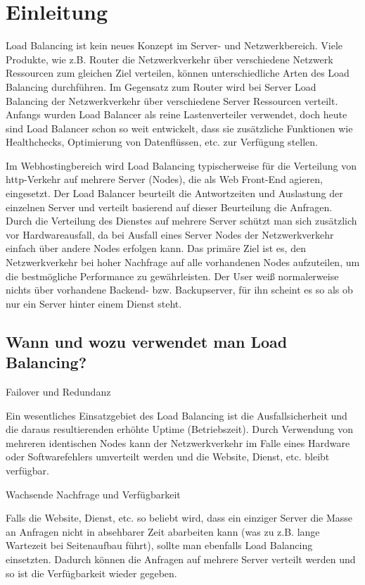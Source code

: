 
\section{Einleitung}
\label{sec:Einleitung}
Load Balancing ist kein neues Konzept im Server- und Netzwerkbereich. Viele Produkte, wie z.B. Router die Netzwerkverkehr über verschiedene Netzwerk Ressourcen zum gleichen Ziel verteilen, können unterschiedliche Arten des Load Balancing durchführen. Im Gegensatz zum Router wird bei Server Load Balancing der Netzwerkverkehr über verschiedene Server Ressourcen verteilt. Anfangs wurden Load Balancer als reine Lastenverteiler verwendet, doch heute sind Load Balancer schon so weit entwickelt, dass sie zusätzliche Funktionen wie Healthchecks, Optimierung von Datenflüssen, etc. zur Verfügung stellen.

Im Webhostingbereich wird Load Balancing typischerweise für die Verteilung von http-Verkehr auf mehrere Server (Nodes), die als Web Front-End agieren, eingesetzt. Der Load Balancer beurteilt die Antwortzeiten und Auslastung der einzelnen Server und verteilt basierend auf dieser Beurteilung die Anfragen. Durch die Verteilung des Dienstes auf mehrere Server schützt man sich zusätzlich vor Hardwareausfall, da bei Ausfall eines Server Nodes der Netzwerkverkehr einfach über andere Nodes erfolgen kann. Das primäre Ziel ist es, den Netzwerkverkehr bei hoher Nachfrage auf alle vorhandenen Nodes aufzuteilen, um die bestmögliche Performance zu gewährleisten. Der User weiß normalerweise nichts über vorhandene Backend- bzw. Backupserver, für ihn scheint es so als ob nur ein Server hinter einem Dienst steht. \cite{LoadBalancing1}

\subsection{Wann und wozu verwendet man Load Balancing?}
\label{sec:Wann und wozu verwendet man Load Balancing?}

\begin{list}{•}{}
\item Failover und Redundanz

	  Ein wesentliches Einsatzgebiet des Load Balancing ist die Ausfallsicherheit und die daraus resultierenden 		  erhöhte Uptime (Betriebszeit). Durch Verwendung von mehreren identischen Nodes kann der Netzwerkverkehr im 	  Falle eines Hardware oder Softwarefehlers umverteilt werden und die Website, Dienst, etc. bleibt 			 	  verfügbar. 
\item Wachsende Nachfrage und Verfügbarkeit
	  
	  Falls die Website, Dienst, etc. so beliebt wird, dass ein einziger Server die Masse an Anfragen nicht in 			  absehbarer Zeit abarbeiten kann (was zu z.B. lange Wartezeit bei Seitenaufbau führt), sollte man ebenfalls 	  Load Balancing einsetzten. Dadurch können die Anfragen auf mehrere Server verteilt werden und so ist die 			  Verfügbarkeit wieder gegeben. \cite{LoadBalancing1}  
\end{list}

